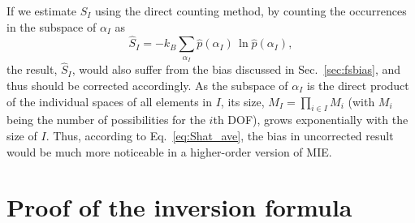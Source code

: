 \documentclass[reprint, superscriptaddress]{revtex4-1}
\newcommand{\note}[1]{{\color{DarkGreen}\footnotesize \textsc{Note.} #1}}
\newcommand{\MI}{\mathcal I} %
\begin{document}
%


If we estimate $S_I$ using the direct counting method,
by counting the occurrences in the subspace of $\alpha_I$ as
$$
\hat S_I = - k_B \sum_{\alpha_I} \hat p(\alpha_I) \, \ln \hat p(\alpha_I),
$$
the result, $\hat S_I$, would also suffer from the bias discussed
in Sec.~\ref{sec:fsbias}, and thus should be corrected accordingly.
%
As the subspace of $\alpha_I$ is the direct product of
the individual spaces of all elements in $I$,
its size, $M_I = \prod_{i \in I} M_i$
(with $M_i$ being the number of possibilities for the $i$th DOF),
grows exponentially with the size of $I$.
%
Thus, according to Eq.~\eqref{eq:Shat_ave},
the bias in uncorrected result would be much more noticeable
in a higher-order version of MIE.


\appendix

\section{\label{sec:inclexcl}
Proof of the inversion formula }
\end{document}
